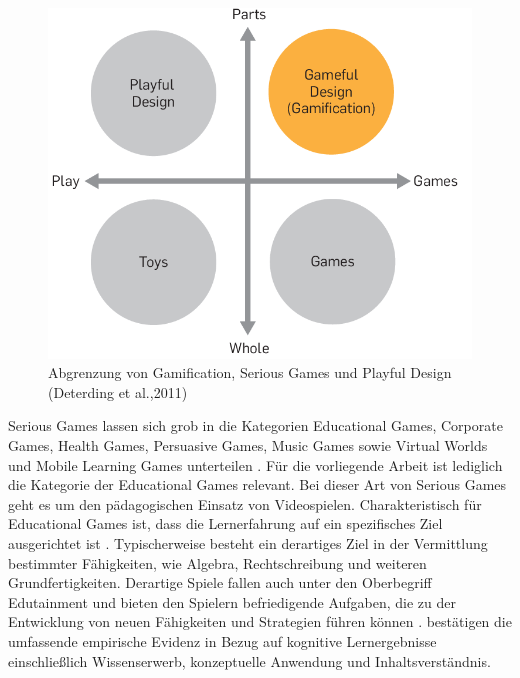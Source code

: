 \begin{figure}[htp]
    \centering
    \includegraphics{img/detering_gamificatrion_pic.png}
    \caption{Abgrenzung von Gamification, Serious Games und Playful Design (Deterding  et  al.,2011)}
    \label{fig:deterding}
\end{figure}

Serious Games lassen sich grob in die Kategorien Educational  Games, 
Corporate  Games,  Health  Games,  Persuasive  Games,  Music  Games  sowie  Virtual  Worlds  und 
Mobile Learning Games unterteilen \cite[S.4]{bopp_serious_2009}.
Für die vorliegende Arbeit ist lediglich die Kategorie der Educational  Games relevant.
Bei dieser Art von Serious Games geht es um den pädagogischen Einsatz von Videospielen.
Charakteristisch für Educational  Games ist, dass die Lernerfahrung auf ein spezifisches Ziel ausgerichtet ist \cite{nielsen_overview_2006, bopp_serious_2009}.
Typischerweise besteht ein derartiges Ziel in der Vermittlung bestimmter Fähigkeiten, wie Algebra, Rechtschreibung und weiteren Grundfertigkeiten.
Derartige Spiele fallen auch unter den Oberbegriff Edutainment \cite{nielsen_overview_2006} und bieten den Spielern befriedigende Aufgaben, die zu der Entwicklung von neuen Fähigkeiten und Strategien führen können \cite{stapleton_serious_2004}.
 bestätigen die umfassende empirische Evidenz in Bezug auf kognitive Lernergebnisse einschließlich Wissenserwerb, konzeptuelle Anwendung und Inhaltsverständnis.

